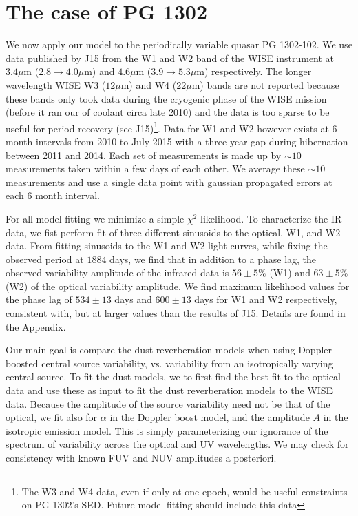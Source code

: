\section{The case of PG 1302}
\label{S:PG1302}
We now apply our model to the periodically variable quasar PG 1302-102. We use data published by J15 from the W1 and W2 band of the WISE instrument at $3.4 \mu$m ($2.8 \rightarrow 4.0 \mu$m) and $4.6 \mu$m ($3.9 \rightarrow 5.3 \mu$m) respectively. The longer wavelength WISE W3 ($12 \mu$m) and W4 ($22 \mu$m) bands are not reported because these bands only took data during the cryogenic phase of the WISE mission (before it ran our of coolant circa late 2010) and the data is too sparse to be useful for period recovery (see J15)\footnote{The W3 and W4 data, even if only at one epoch, would be useful constraints on PG 1302's SED. Future model fitting should include this data}. Data for W1 and W2 however exists at 6 month intervals from 2010 to July 2015 with a three year gap during hibernation between 2011 and 2014. Each set of measurements is made up by $\sim 10$ measurements taken within a few days of each other. We average these $\sim10$ measurements and use a single data point with gaussian propagated errors at each 6 month interval. %


For all model fitting we minimize a simple $\chi^2$ likelihood.
To characterize the IR data, we fist perform fit of three different sinusoids to the optical, W1, and W2 data.
From fitting sinusoids to the W1 and W2 light-curves, while fixing the observed period at $1884$ days, we find that in addition to a phase lag, the observed variability amplitude of the infrared data is $56\pm5\%$ (W1) and $63\pm5\%$ (W2) of the optical variability amplitude. We find maximum likelihood values for the phase lag of $534\pm13$ days and $600\pm13$ days for W1 and W2 respectively, consistent with, but at larger values than the results of J15.  Details are found in the Appendix.


Our main goal is compare the dust reverberation models when using Doppler
boosted central source variability, vs. variability from an isotropically varying central source.
To fit the dust models, we to first find the
best fit to the optical data and use these as input to fit the
dust reverberation models to the WISE data. Because the amplitude of the source variability 
need not be that of the optical, we fit also for $\alpha$ in the Doppler boost 
model, and the amplitude $A$ in the isotropic emission model. This is 
simply parameterizing our ignorance of the spectrum of variability across the optical 
and UV wavelengths. We may check for consistency with known FUV and NUV amplitudes a posteriori.


